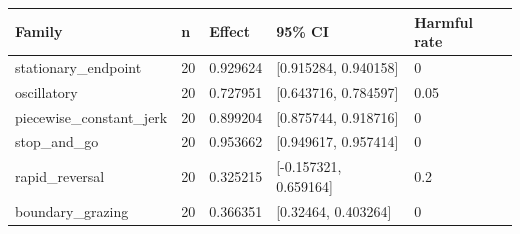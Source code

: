 \begin{tabular}{lllll}
\hline
Family & n & Effect & 95\% CI & Harmful rate \\
\hline
stationary\_endpoint & 20 & 0.929624 & [0.915284, 0.940158] & 0 \\
oscillatory & 20 & 0.727951 & [0.643716, 0.784597] & 0.05 \\
piecewise\_constant\_jerk & 20 & 0.899204 & [0.875744, 0.918716] & 0 \\
stop\_and\_go & 20 & 0.953662 & [0.949617, 0.957414] & 0 \\
rapid\_reversal & 20 & 0.325215 & [-0.157321, 0.659164] & 0.2 \\
boundary\_grazing & 20 & 0.366351 & [0.32464, 0.403264] & 0 \\
\hline
\end{tabular}
